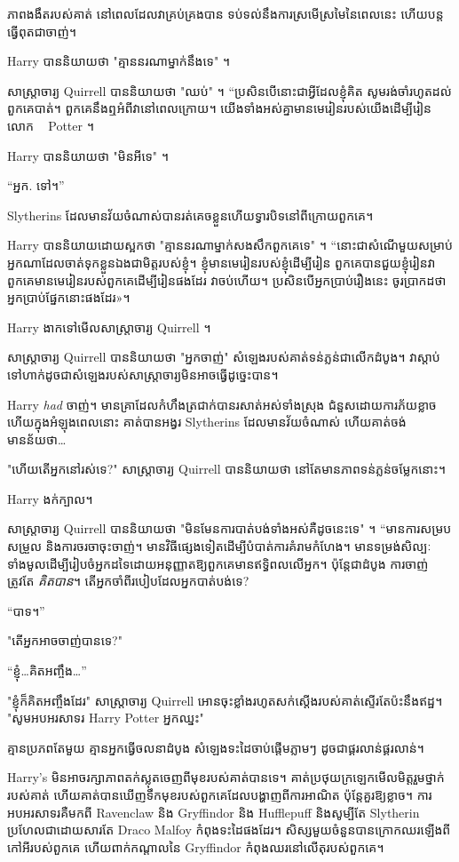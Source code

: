 {{{{{ភាពងងឹតរបស់គាត់ នៅពេលដែលវាគ្រប់គ្រងបាន ទប់ទល់នឹងការស្រមើស្រមៃនៃពេលនេះ ហើយបន្តធ្វើពុតជាចាញ់។

Harry បាននិយាយថា "គ្មាននរណាម្នាក់នឹងទេ" ។

សាស្រ្តាចារ្យ Quirrell បាននិយាយថា "ឈប់" ។ “ប្រសិនបើនោះជាអ្វីដែលខ្ញុំគិត សូមរង់ចាំរហូតដល់ពួកគេបាត់។ ពួកគេនឹងឮអំពីវានៅពេលក្រោយ។ យើងទាំងអស់គ្នាមានមេរៀនរបស់យើងដើម្បីរៀនលោក ~ Potter ។

Harry បាននិយាយថា "មិនអីទេ" ។

“អ្នក. ទៅ។”

Slytherins ដែលមានវ័យចំណាស់បានរត់គេចខ្លួនហើយទ្វារបិទនៅពីក្រោយពួកគេ។

Harry បាននិយាយដោយស្អកថា "គ្មាននរណាម្នាក់សងសឹកពួកគេទេ" ។ “នោះ​ជា​សំណើ​មួយ​សម្រាប់​អ្នក​ណា​ដែល​ចាត់​ទុក​ខ្លួន​ឯង​ជា​មិត្ត​របស់​ខ្ញុំ។ ខ្ញុំមានមេរៀនរបស់ខ្ញុំដើម្បីរៀន ពួកគេបានជួយខ្ញុំរៀនវា ពួកគេមានមេរៀនរបស់ពួកគេដើម្បីរៀនផងដែរ វាចប់ហើយ។ ប្រសិន​បើ​អ្នក​ប្រាប់​រឿង​នេះ ចូរ​ប្រាកដ​ថា​អ្នក​ប្រាប់​ផ្នែក​នោះ​ផង​ដែរ»។

Harry ងាកទៅមើលសាស្រ្តាចារ្យ Quirrell ។

សាស្រ្តាចារ្យ Quirrell បាននិយាយថា "អ្នកចាញ់" សំឡេងរបស់គាត់ទន់ភ្លន់ជាលើកដំបូង។ វា​ស្តាប់​ទៅ​ហាក់​ដូច​ជា​សំឡេង​របស់​សាស្ត្រាចារ្យ​មិន​អាច​ធ្វើ​ដូច្នេះ​បាន​។

Harry \emph{had} ចាញ់។ មានគ្រាដែលកំហឹងត្រជាក់បានរសាត់អស់ទាំងស្រុង ជំនួសដោយការភ័យខ្លាច ហើយក្នុងអំឡុងពេលនោះ គាត់បានអង្វរ Slytherins ដែលមានវ័យចំណាស់ ហើយគាត់ចង់មានន័យថា…

"ហើយតើអ្នកនៅរស់ទេ?" សាស្ត្រាចារ្យ Quirrell បាននិយាយថា នៅតែមានភាពទន់ភ្លន់ចម្លែកនោះ។

Harry ងក់ក្បាល។

សាស្រ្តាចារ្យ Quirrell បាននិយាយថា "មិនមែនការបាត់បង់ទាំងអស់គឺដូចនេះទេ" ។ “មានការសម្របសម្រួល និងការចរចាចុះចាញ់។ មានវិធីផ្សេងទៀតដើម្បីបំបាត់ការគំរាមកំហែង។ មានទម្រង់សិល្បៈទាំងមូលដើម្បីរៀបចំអ្នកដទៃដោយអនុញ្ញាតឱ្យពួកគេមានឥទ្ធិពលលើអ្នក។ ប៉ុន្តែជាដំបូង ការចាញ់ត្រូវតែ \emph{គិតបាន}។ តើអ្នកចាំពីរបៀបដែលអ្នកបាត់បង់ទេ?

“បាទ។”

"តើអ្នកអាចចាញ់បានទេ?"

“ខ្ញុំ…គិតអញ្ចឹង…”

"ខ្ញុំក៏គិតអញ្ចឹងដែរ" សាស្ត្រាចារ្យ Quirrell អោន​ចុះ​ខ្លាំង​រហូត​សក់​ស្តើង​របស់​គាត់​ស្ទើរតែ​ប៉ះ​នឹង​ឥដ្ឋ។ "សូមអបអរសាទរ Harry Potter អ្នកឈ្នះ"

គ្មានប្រភពតែមួយ គ្មានអ្នកធ្វើចលនាដំបូង សំឡេងទះដៃចាប់ផ្តើមភ្លាមៗ ដូចជាផ្គរលាន់ផ្គរលាន់។

Harry's មិនអាចរក្សាភាពតក់ស្លុតចេញពីមុខរបស់គាត់បានទេ។ គាត់ប្រថុយក្រឡេកមើលមិត្តរួមថ្នាក់របស់គាត់ ហើយគាត់បានឃើញទឹកមុខរបស់ពួកគេដែលបង្ហាញពីការអាណិត ប៉ុន្តែគួរឱ្យខ្លាច។ ការអបអរសាទរគឺមកពី Ravenclaw និង Gryffindor និង Hufflepuff និងសូម្បីតែ Slytherin ប្រហែលជាដោយសារតែ Draco Malfoy កំពុងទះដៃផងដែរ។ សិស្សមួយចំនួនបានក្រោកឈរឡើងពីកៅអីរបស់ពួកគេ ហើយពាក់កណ្តាលនៃ Gryffindor កំពុងឈរនៅលើតុរបស់ពួកគេ។

}}}}}
